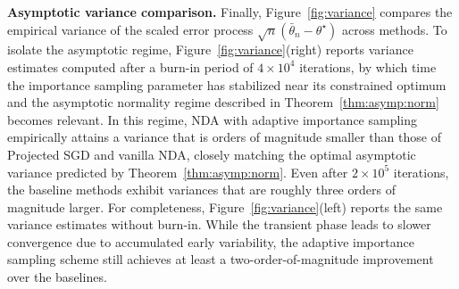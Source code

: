 \documentclass[11pt,a4paper]{article}
\theoremstyle{definition}
\begin{document}
\medskip
\noindent
\textbf{Asymptotic variance comparison.}
Finally, Figure~\ref{fig:variance} compares the empirical variance of the scaled error process $\sqrt{n}(\bar\theta_n-\theta^\star)$ across methods. To isolate the asymptotic regime, Figure~\ref{fig:variance}(right) reports variance estimates computed after a burn-in period of $4\times 10^4$ iterations, by which time the importance sampling parameter has stabilized near its constrained optimum and the asymptotic normality regime described in Theorem~\ref{thm:asymp:norm} becomes relevant. In this regime, NDA with adaptive importance sampling empirically attains a variance that is orders of magnitude smaller than those of Projected SGD and vanilla NDA, closely matching the optimal asymptotic variance predicted by Theorem~\ref{thm:asymp:norm}. Even after $2\times 10^5$ iterations, the baseline methods exhibit variances that are roughly three orders of magnitude larger. For completeness, Figure~\ref{fig:variance}(left) reports the same variance estimates without burn-in. While the transient phase leads to slower convergence due to accumulated early variability, the adaptive importance sampling scheme still achieves at least a two-order-of-magnitude improvement over the baselines. 









\end{document}
